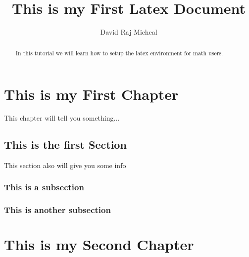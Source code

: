 \documentclass{report}
\title{This is my First Latex Document}
\date{}
\author{David Raj Micheal}
\begin{document}
\maketitle

\tableofcontents


\begin{abstract}
In this tutorial we will learn how to setup the latex environment for math users.
\end{abstract}

\chapter{This is my First Chapter}
This chapter will tell you something...
\section{This is the first Section}

This section also will give you some info

\subsection{This is a subsection}


\subsection{This is another subsection}

\chapter{This is my Second Chapter}
\end{document}
